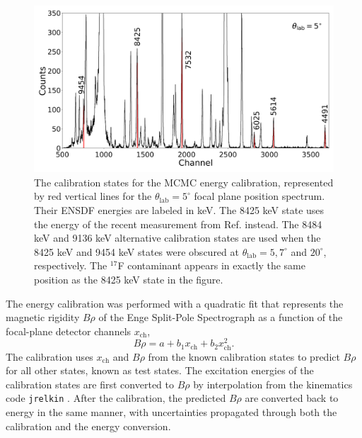 \begin{figure}[t]
\centering
\includegraphics[width=6.5in]{Chapter-6/figs/CalibrationStates.png}
\caption{\label{fig:Calibration_States}The calibration states for the MCMC energy calibration, represented by red vertical lines for the $\theta_{\mathrm{lab}} = 5^{\circ}$ focal plane position spectrum. Their ENSDF \cite{Chen2017} energies are labeled in keV. The 8425 keV state uses the energy of the recent measurement from Ref. \cite{Gribble2022} instead. The 8484 keV and 9136 keV alternative calibration states are used when the 8425 keV and 9454 keV states were obscured at $\theta_{\mathrm{lab}} = 5,7^{\circ}$ and $20^{\circ}$, respectively. The $^{17}$F contaminant appears in exactly the same position as the 8425 keV state in the figure.}
\end{figure}

The energy calibration was performed with a quadratic fit that represents the magnetic rigidity $B\rho$ of the Enge Split-Pole Spectrograph as a function of the focal-plane detector channels $x_{\mathrm{ch}}$,
\begin{equation} \label{eqn:energy_cal}
B\rho = a + b_{1}x_{\mathrm{ch}} + b_{2} x_{\mathrm{ch}}^{2}.
\end{equation}
The calibration uses $x_{\mathrm{ch}}$ and $B\rho$ from the known calibration states to predict $B\rho$ for all other states, known as test states. The excitation energies of the calibration states are first converted to $B\rho$ by interpolation from the kinematics code \texttt{jrelkin} \cite{jrelkin}. After the calibration, the predicted $B\rho$ are converted back to energy in the same manner, with uncertainties propagated through both the calibration and the energy conversion.

